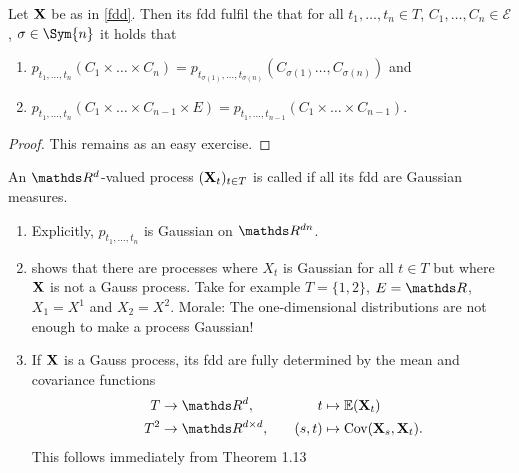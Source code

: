 \begin{prop}
	Let $\mathbf{X}$ be as in \ref{fdd}.
	Then its fdd fulfil the 
	that for all $t_1, \dots, t_n \in T$,
	$C_1, \dots, C_n \in \mathcal{E}$,
	$\sigma \in \Sym{n}$ it holds that
\begin{enumerate}[label={(C\arabic*)}]
\item $p_{t_1,\dots ,t_n}(C_1\times \dots \times C_n)
	= p_{t_{\sigma(1)}, \dots, t_{\sigma(n)}}(
		C_{\sigma(1)}\dots ,C_{\sigma(n)}
	)$
	and
\item $p_{t_1,\dots , t_n}(C_1\times \dots \times C_{n-1}\times E)
	= p_{t_1,\dots ,t_{n-1}}(C_1\times \dots \times C_{n-1})$.
\qedhere
\end{enumerate}
\end{prop}
\begin{proof}
	This remains as an easy exercise.
\end{proof}

\begin{defi}
	An $\Rd$-valued process $(\mathbf{X}_t)_{t \in T}$
	is called 
	if all its fdd are Gaussian measures.
\end{defi}

\begin{bem}
\begin{enumerate}[label=(\alph*)]
\item Explicitly, $p_{t_1,\dots , t_n}$ is Gaussian on $\R^{dn}$.
\item {} shows that there are processes
	where $X_t$ is Gaussian for all $t\in T$
	but where $\mathbf{X}$ is not a Gauss process.
	Take for example $T=\{1,2\}$, $E=\R$, $X_1=X^1$ and $X_2=X^2$.
	Morale:
	The one-dimensional distributions
	are not enough to make a process Gaussian!
\item If $\mathbf{X}$ is a Gauss process,
	its fdd are fully determined by
	the mean and covariance functions
	\begin{align*}
	\hspace*{2.5cm} && T &\to \Rd,& t &\mapsto \E{\X_t} && \hspace*{2.5cm}\\
	&& T^2 &\to \R^{d\times d},& \quad (s,t) &\mapsto \Cov(\X_s, \X_t).
	\end{align*}
	This follows immediately from Theorem 1.13
\qedhere
\end{enumerate}
\end{bem}

